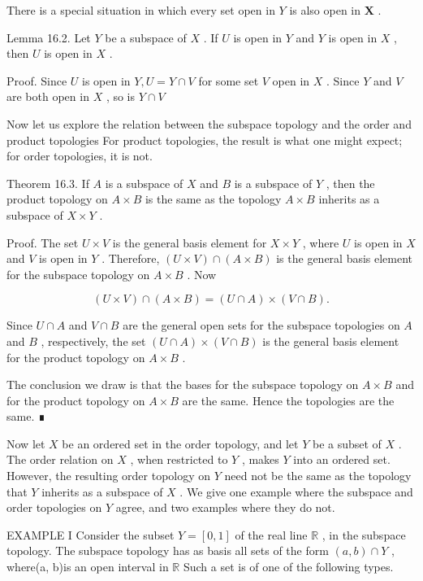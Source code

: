 There is a special situation in which every set open in \(Y\) is also open in \(\mathbf{X}\) .

Lemma 16.2. Let \(Y\) be a subspace of \(X\) . If \(U\) is open in \(Y\) and \(Y\) is open in \(X\) , then \(U\) is open in \(X\) .

Proof. Since \(U\) is open in \(Y,U = Y \cap  V\) for some set \(V\) open in \(X\) . Since \(Y\) and \(V\) are both open in \(X\) , so is \(Y \cap  V\)

Now let us explore the relation between the subspace topology and the order and product topologies For product topologies, the result is what one might expect; for order topologies, it is not.

Theorem 16.3. If \(A\) is a subspace of \(X\) and \(B\) is a subspace of \(Y\) , then the product topology on \(A \times  B\) is the same as the topology \(A \times  B\) inherits as a subspace of \(X \times  Y\) .

Proof. The set \(U \times  V\) is the general basis element for \(X \times  Y\) , where \(U\) is open in \(X\) and \(V\) is open in \(Y\) . Therefore, \(\left( {U \times  V}\right)  \cap  \left( {A \times  B}\right)\) is the general basis element for the subspace topology on \(A \times  B\) . Now

\[
\left( {U \times  V}\right)  \cap  \left( {A \times  B}\right)  = \left( {U \cap  A}\right)  \times  \left( {V \cap  B}\right) .
\]

Since \(U \cap  A\) and \(V \cap  B\) are the general open sets for the subspace topologies on \(A\) and \(B\) , respectively, the set \(\left( {U \cap  A}\right)  \times  \left( {V \cap  B}\right)\) is the general basis element for the product topology on \(A \times  B\) .

The conclusion we draw is that the bases for the subspace topology on \(A \times  B\) and for the product topology on \(A \times  B\) are the same. Hence the topologies are the same. ∎

Now let \(X\) be an ordered set in the order topology, and let \(Y\) be a subset of \(X\) . The order relation on \(X\) , when restricted to \(Y\) , makes \(Y\) into an ordered set. However, the resulting order topology on \(Y\) need not be the same as the topology that \(Y\) inherits as a subspace of \(X\) . We give one example where the subspace and order topologies on \(Y\) agree, and two examples where they do not.

EXAMPLE I Consider the subset \(Y = \left\lbrack  {0,1}\right\rbrack\) of the real line \(\mathbb{R}\) , in the subspace topology. The subspace topology has as basis all sets of the form \(\left( {a,b}\right)  \cap  Y\) , where(a, b)is an open interval in \(\mathbb{R}\) Such a set is of one of the following types.

